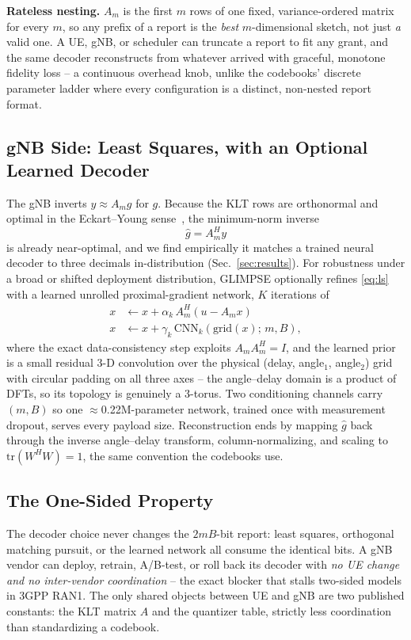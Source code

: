 \documentclass[conference]{IEEEtran}
\begin{document}
\textbf{Rateless nesting.} $A_m$ is the first $m$ rows of one fixed, variance-ordered matrix for every $m$, so any prefix of a report is the \emph{best} $m$-dimensional sketch, not just \emph{a} valid one. A UE, gNB, or scheduler can truncate a report to fit any grant, and the same decoder reconstructs from whatever arrived with graceful, monotone fidelity loss -- a continuous overhead knob, unlike the codebooks' discrete parameter ladder where every configuration is a distinct, non-nested report format.

\subsection{gNB Side: Least Squares, with an Optional Learned Decoder}
The gNB inverts $y\approx A_m g$ for $g$. Because the KLT rows are orthonormal and optimal in the Eckart--Young sense~\cite{eckartyoung1936}, the minimum-norm inverse
\begin{equation}
\hat{g} = A_m^{H} y
\label{eq:ls}
\end{equation}
is already near-optimal, and we find empirically it matches a trained neural decoder to three decimals in-distribution (Sec.~\ref{sec:results}). For robustness under a broad or shifted deployment distribution, GLIMPSE optionally refines \eqref{eq:ls} with a learned unrolled proximal-gradient network, $K$ iterations of
\begin{equation}
\begin{aligned}
x &\leftarrow x + \alpha_k\, A_m^{H}(u - A_m x) \\
x &\leftarrow x + \gamma_k\, \mathrm{CNN}_k(\mathrm{grid}(x);\, m, B),
\end{aligned}
\label{eq:unroll}
\end{equation}
where the exact data-consistency step exploits $A_mA_m^{H}=I$, and the learned prior is a small residual 3-D convolution over the physical (delay, angle$_1$, angle$_2$) grid with circular padding on all three axes -- the angle--delay domain is a product of DFTs, so its topology is genuinely a 3-torus. Two conditioning channels carry $(m,B)$ so one $\approx$0.22M-parameter network, trained once with measurement dropout, serves every payload size. Reconstruction ends by mapping $\hat g$ back through the inverse angle--delay transform, column-normalizing, and scaling to $\mathrm{tr}(W^{H}W)=1$, the same convention the codebooks use.

\subsection{The One-Sided Property}
The decoder choice never changes the $2mB$-bit report: least squares, orthogonal matching pursuit, or the learned network all consume the identical bits. A gNB vendor can deploy, retrain, A/B-test, or roll back its decoder with \emph{no UE change and no inter-vendor coordination} -- the exact blocker that stalls two-sided models in 3GPP RAN1. The only shared objects between UE and gNB are two published constants: the KLT matrix $A$ and the quantizer table, strictly less coordination than standardizing a codebook.
\end{document}
